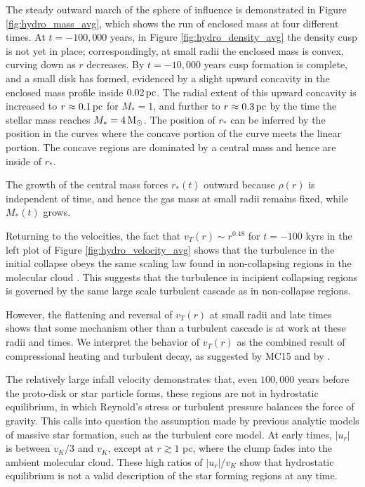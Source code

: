 \documentclass[../dissertation.tex]{subfiles}
\begin{document}
The steady outward march of the sphere of influence 
is demonstrated in Figure \ref{fig:hydro_mass_avg}, 
which shows the run of enclosed mass at four different times.  
At $t=-100,000$ years, in Figure \ref{fig:hydro_density_avg} the density cusp is not yet in place; 
correspondingly, at small radii
the enclosed mass is convex, curving down as $r$ decreases. By $t=-10,000$
years cusp formation is complete, and a small disk has formed, evidenced by a slight
upward concavity in the enclosed mass profile inside $0.02\,\rm pc$.  
The radial extent of this upward concavity is increased to $r\approx 0.1\,\rm pc$ 
for $M_*=1$, and further to $r\approx0.3\,\rm pc$ by the time the stellar mass reaches 
$M_*=4\,{\rm M}_{\odot}$. The position of $r_*$ can be inferred by the position 
in the curves where the concave portion of the curve meets the linear portion.  
The concave regions are dominated by a central mass and hence are inside of $r_*$.  

The growth of the central mass forces $r_*(t)$ outward because $\rho(r)$ 
is independent of time, and hence the gas mass at small radii remains fixed, while
$M_*(t)$ grows. 

Returning to the velocities, the fact that $v_T(r) \sim r^{0.48}$ for $t=-100$ kyrs in the left plot of Figure \ref{fig:hydro_velocity_avg} shows that the 
turbulence in the 
initial collapse obeys the same scaling law found in non-collapsing
regions in the molecular cloud \citep{2015ApJ...800...49L}.  
This suggests that the turbulence in incipient collapsing 
regions is governed by the same large scale turbulent cascade as in 
non-collapse regions. 

However, the flattening and reversal of $v_T(r)$ 
at small radii and late times shows that some mechanism other than a 
turbulent cascade is at work at these radii and times. We interpret the 
behavior of $v_T(r)$ as the combined result of compressional heating and 
turbulent decay, as suggested by MC15 and by \citet{2012ApJ...750L..31R}.  

The relatively large infall velocity demonstrates that, even $100,000$ years before 
the proto-disk or star particle forms, these regions 
are not in hydrostatic equilibrium, in which Reynold's stress or turbulent pressure balances the force of gravity.  This calls into question
the assumption made by previous analytic models of massive star formation, 
such as the turbulent core model.
%
At early times, $|u_r|$ is between $v_K/3$ and $v_K$, except 
at $r\gtrsim 1$ pc, where the clump fades into the ambient 
molecular cloud.  These high ratios of $|u_r|/v_K$ show that 
hydrostatic equilibrium is not a valid description of the star forming 
regions at any time. 
\end{document}
